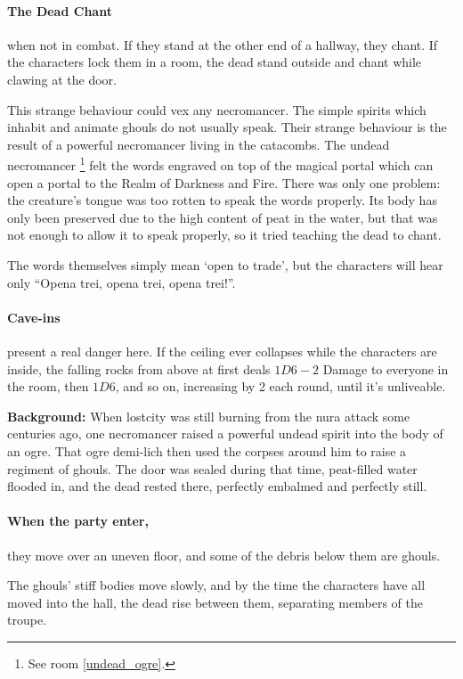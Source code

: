 \paragraph{The Dead Chant} when not in combat.
If they stand at the other end of a hallway, they chant.
If the characters lock them in a room, the dead stand outside and chant while clawing at the door.

This strange behaviour could vex any necromancer.
The simple spirits which inhabit and animate ghouls do not usually speak.
Their strange behaviour is the result of a powerful necromancer living in the catacombs.
The undead necromancer%
\footnote{See room \ref{undead_ogre}.}
felt the words engraved on top of the magical portal which can open a portal to the Realm of Darkness and Fire.
There was only one problem: the creature's tongue was too rotten to speak the words properly.
Its body has only been preserved due to the high content of peat in the water, but that was not enough to allow it to speak properly, so it tried teaching the dead to chant.

The words themselves simply mean `open to trade', but the characters will hear only ``Opena trei, opena trei, opena trei!''.

\paragraph{Cave-ins} present a real danger here.  If the ceiling ever collapses while the characters are inside, the falling rocks from above at first deals $1D6-2$ Damage to everyone in the room, then $1D6$, and so on, increasing by 2 each round, until it's unliveable.


\textbf{Background:}
When \gls{lostcity} was still burning from the nura attack some centuries ago, one necromancer raised a powerful undead spirit into the body of an ogre.
That ogre demi-lich then used the corpses around him to raise a regiment of ghouls.
The door was sealed during that time, peat-filled water flooded in, and the dead rested there, perfectly embalmed and perfectly still.

\paragraph{When the party enter,}
they move over an uneven floor, and some of the debris below them are ghouls.

The ghouls' stiff bodies move slowly, and by the time the characters have all moved into the hall, the dead rise between them, separating members of the troupe.

